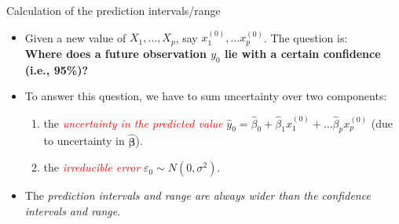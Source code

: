\documentclass[
  10pt,
  ignorenonframetext,
]{beamer}
\providecommand{\tightlist}{%
  \setlength{\itemsep}{0pt}\setlength{\parskip}{0pt}}
\begin{document}
\begin{frame}
\begin{block}{Calculation of the prediction intervals/range}
\protect\hypertarget{calculation-of-the-prediction-intervalsrange}{}
\(~\)

\begin{itemize}
\tightlist
\item
  Given a new value of \(X_1, \ldots, X_p\), say
  \(x_1^{(0)}, \ldots x_p^{(0)}\). The question is:\\
  \vspace{2mm} \textbf{Where does a future observation \(y_0\) lie with
  a certain confidence (i.e., 95\%)?}
\end{itemize}

\vspace{6mm}

\begin{itemize}
\item
  To answer this question, we have to sum uncertainty over two
  components:

  \begin{enumerate}
  \item
    the \emph{\textcolor{red}{uncertainty in the predicted value}}
    \(\hat y_0 = \hat\beta_0 + \hat\beta_1 x_1^{(0)} + \ldots \hat\beta_p x_p^{(0)}\)
    (due to uncertainty in \(\hat{\boldsymbol\beta}\)).
  \item
    the \emph{\textcolor{red}{irreducible error}}
    \(\varepsilon_0 \sim N(0,\sigma^2)\).
  \end{enumerate}
\end{itemize}

\vspace{4mm}

\begin{itemize}
\tightlist
\item
  The \emph{prediction intervals and range are always wider than the
  confidence intervals and range}.
\end{itemize}
\end{block}
\end{frame}
\end{document}
